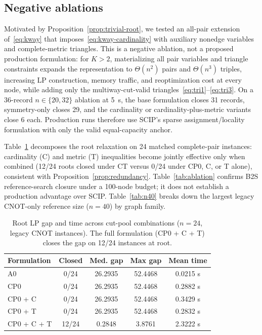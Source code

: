\documentclass[
  aps,
  pra,
  reprint,
  amsmath,
  amssymb,
  longbibliography,
  nofootinbib,
  floatfix
]{revtex4-2}
\theoremstyle{plain}
\newcommand{\tabfit}[1]{{\footnotesize #1}}
\begin{document}
\subsection{Negative ablations}

Motivated by Proposition~\ref{prop:trivial-root}, we tested an all-pair extension of~\eqref{eq:kway} that imposes~\eqref{eq:kway-cardinality} with auxiliary nonedge variables and complete-metric triangles. This is a negative ablation, not a proposed production formulation: for $K>2$, materializing all pair variables and triangle constraints expands the representation to $\Theta(n^2)$ pairs and $\Theta(n^3)$ triples, increasing LP construction, memory traffic, and reoptimization cost at every node, while adding only the multiway-cut-valid triangles~\eqref{eq:tri1}--\eqref{eq:tri3}. On a 36-record $n\in\{20,32\}$ ablation at 5~s, the base formulation closes 31 records, symmetry-only closes 29, and the cardinality or cardinality-plus-metric variants close 6 each. Production runs therefore use SCIP's sparse assignment/locality formulation with only the valid equal-capacity anchor.

Table~\ref{tab:synergy} decomposes the root relaxation on 24 matched complete-pair instances: cardinality (C) and metric (T) inequalities become jointly effective only when combined (12/24 roots closed under CT versus 0/24 under CP0, C, or T alone), consistent with Proposition~\ref{prop:redundancy}. Table~\ref{tab:ablation} confirms B2S reference-search closure under a 100-node budget; it does not establish a production advantage over SCIP. Table~\ref{tab:n40} breaks down the largest legacy CNOT-only reference size ($n=40$) by graph family.

\begin{table}[tbp]
\centering
\caption{Root LP gap and time across cut-pool combinations ($n=24$, legacy CNOT instances). The full formulation (CP0 + C + T) closes the gap on 12/24 instances at root.}
\label{tab:synergy}
\tabfit{%
\begin{tabular*}{\columnwidth}{@{\extracolsep{\fill}}lcccc@{}}
\toprule
\textbf{Formulation} & \textbf{Closed} & \textbf{Med. gap} & \textbf{Max gap} & \textbf{Mean time}\\
\midrule
A0 & 0/24 & 26.2935 & 52.4468 & 0.0215 s\\
CP0 & 0/24 & 26.2935 & 52.4468 & 0.2882 s\\
CP0 + C & 0/24 & 26.2935 & 52.4468 & 0.3429 s\\
CP0 + T & 0/24 & 26.2935 & 52.4468 & 0.2832 s\\
CP0 + C + T & 12/24 & 0.2848 & 3.8761 & 2.3222 s\\
\bottomrule
\end{tabular*}
}
\end{table}
\end{document}
